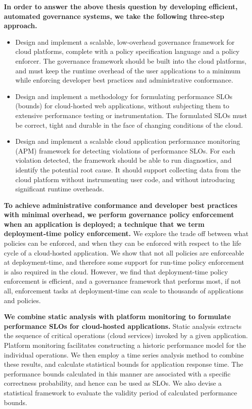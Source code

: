 \textbf{In order to answer the above thesis question by developing efficient, automated governance systems,
we take the following three-step approach.}
\begin{itemize}
\item Design and implement a scalable, low-overhead governance framework for cloud platforms,
complete with a policy specification language and a policy enforcer. The governance framework should be
built into the cloud platforms, and must
keep the runtime overhead of the user applications to a minimum while enforcing
developer best practices and administrative conformance.
\item Design and implement a methodology for formulating performance SLOs (bounds)
for cloud-hosted web applications, without
 subjecting them to extensive performance testing or instrumentation. The formulated
SLOs must be correct, tight and durable in the face of changing conditions of the cloud.
 \item Design and implement a scalable cloud application performance monitoring (APM) framework for detecting
violations of performance SLOs. For each
violation detected, the framework should be able to run diagnostics, and identify the potential
root cause. It should support collecting data from the cloud platform
 without instrumenting user code, and without introducing significant runtime overheads.
\end{itemize}

\textbf{To achieve administrative conformance and developer best practices with minimal overhead,
we perform governance policy enforcement when an application is deployed; a technique that we
term deployment-time policy enforcement.} 
We explore the
trade off between what policies can be enforced, and when they can be enforced with respect
to the life cycle of a cloud-hosted application. We show that not all policies
are enforceable at deployment-time, and therefore some support for run-time policy enforcement
is also required in the cloud. However, we find that
deployment-time policy enforcement is efficient, and a governance framework that
performs most, if not all, enforcement tasks at deployment-time can scale
to thousands of applications and policies.

\textbf{We combine static analysis with platform monitoring to formulate performance SLOs for
cloud-hosted applications.} Static analysis
extracts the sequence of critical operations (cloud services) invoked by a given application.
Platform monitoring facilitates constructing a historic performance model for the individual operations.
We then employ a time series analysis method to combine these results, and calculate statistical bounds 
for application response time. The performance bounds calculated in this manner
are associated with a specific correctness probability, and hence can be used
as SLOs. We also devise a statistical framework to evaluate the validity period of 
calculated performance bounds.

